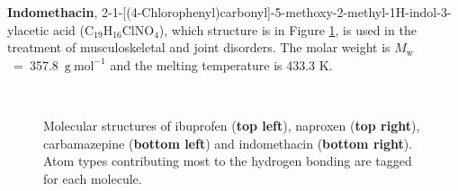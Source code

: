 \textbf{Indomethacin}, 2-{1-[(4-Chlorophenyl)carbonyl]-5-methoxy-2-methyl-1H-indol-3-yl}acetic acid (C$_{19}$H$_{16}$ClNO$_{4}$), which structure is in Figure \ref{fig:APIs}, is used in the treatment of musculoskeletal and joint disorders. The molar weight is $M_\mathrm{w}$~=~357.8~$\mathrm{g\ mol^{-1}}$ and the melting temperature is 433.3 K. \cite{stejfa_heat_2021}
\begin{figure}[htb!]
	\hspace{1.2cm}
	\hspace{2cm}
	\\
	\hspace{2cm}
	\hspace{2cm}
	\caption{Molecular structures of ibuprofen (\textbf{top left}), naproxen (\textbf{top right}), carbamazepine (\textbf{bottom left}) and indomethacin (\textbf{bottom right}). Atom types contributing most to the hydrogen bonding are tagged for each molecule.}
	\label{fig:APIs}
\end{figure}

